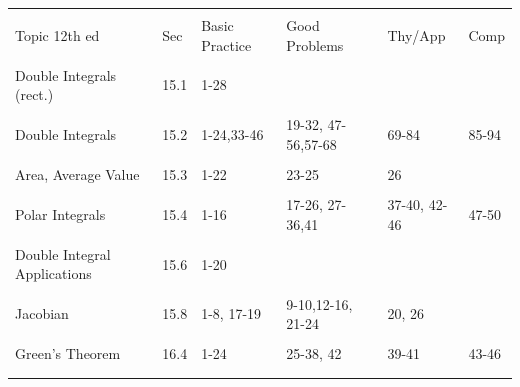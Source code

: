\documentclass[10pt,]{book}
\theoremstyle{plain}
\theoremstyle{definition}
\theoremstyle{definition}
\theoremstyle{definition}
\theoremstyle{definition}
\theoremstyle{definition}
\numberwithin{equation}{section}
\newcommand{\hrulethin}  {\noalign{\hrule height 0.04em}}
\begin{document}
\begin{tabular}{llllll}
&&&&&\tabularnewline\hrulethin
Topic {12th ed}&Sec&Basic Practice&Good Problems&Thy/App&Comp\tabularnewline[0pt]
&&&&&\tabularnewline\hrulethin
Double Integrals (rect.)&15.1&1-28&&&\tabularnewline[0pt]
&&&&&\tabularnewline\hrulethin
Double Integrals&15.2&1-24,33-46&19-32, 47-56,57-68&69-84&85-94\tabularnewline[0pt]
&&&&&\tabularnewline\hrulethin
Area, Average Value&15.3&1-22&23-25&26&\tabularnewline[0pt]
&&&&&\tabularnewline\hrulethin
Polar Integrals&15.4&1-16&17-26, 27-36,41&37-40, 42-46&47-50\tabularnewline[0pt]
&&&&&\tabularnewline\hrulethin
Double Integral Applications&15.6&1-20&&&\tabularnewline[0pt]
&&&&&\tabularnewline\hrulethin
Jacobian&15.8&1-8, 17-19&9-10,12-16, 21-24&20, 26&\tabularnewline[0pt]
&&&&&\tabularnewline\hrulethin
Green's Theorem&16.4&1-24&25-38, 42&39-41&43-46\tabularnewline[0pt]
&&&&&\tabularnewline\hrulethin
\end{tabular}
\typeout{************************************************}
\typeout{************************************************}
\end{document}
